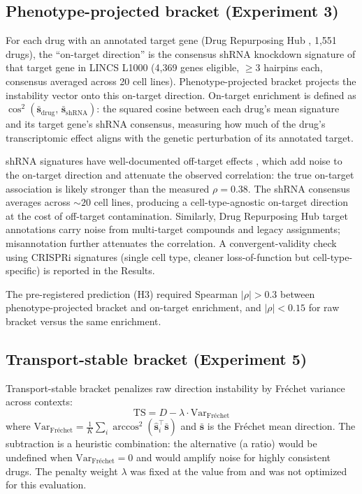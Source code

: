 \documentclass[11pt]{article}
\begin{document}
\subsection{Phenotype-projected bracket (Experiment 3)}

For each drug with an annotated target gene (Drug Repurposing Hub
\citep{corsello2017drug}, 1{,}551 drugs), the ``on-target direction'' is the consensus shRNA
knockdown signature of that target gene in LINCS L1000 (4{,}369 genes
eligible, $\geq$3 hairpins each, consensus averaged across 20 cell lines).
Phenotype-projected bracket projects the instability vector onto this
on-target direction. On-target enrichment is defined as $\cos^2(\bar{\mathbf{s}}_{\text{drug}},\,
\bar{\mathbf{s}}_{\text{shRNA}})$: the squared cosine between each drug's
mean signature and its target gene's shRNA consensus, measuring how much
of the drug's transcriptomic effect aligns with the genetic perturbation of
its annotated target.

shRNA signatures have well-documented off-target effects
\citep{smith2017evaluation}, which add noise to the on-target direction
and attenuate the observed correlation: the true on-target association is
likely stronger than the measured $\rho = 0.38$.
The shRNA consensus averages across ${\sim}20$ cell lines, producing a
cell-type-agnostic on-target direction at the cost of off-target
contamination. Similarly, Drug Repurposing Hub target annotations carry
noise from multi-target compounds and legacy assignments; misannotation
further attenuates the correlation. A convergent-validity
check using CRISPRi signatures (single cell type, cleaner
loss-of-function but cell-type-specific) is reported in the Results.

The pre-registered prediction (H3) required Spearman $|\rho| > 0.3$ between
phenotype-projected bracket and on-target enrichment, and $|\rho| < 0.15$
for raw bracket versus the same enrichment.

\subsection{Transport-stable bracket (Experiment 5)}

Transport-stable bracket penalizes raw direction instability by Fr\'{e}chet
variance across contexts:
\begin{equation}
  \text{TS} = D - \lambda \cdot \text{Var}_{\text{Fr\'echet}}
  \label{eq:ts}
\end{equation}
where $\text{Var}_{\text{Fr\'echet}} = \frac{1}{K}\sum_i
\arccos^2(\hat{\mathbf{s}}_i^\top \bar{\mathbf{s}})$ and
$\bar{\mathbf{s}}$ is the Fr\'echet mean direction. The subtraction is a
heuristic combination: the alternative (a ratio) would be undefined when
$\text{Var}_{\text{Fr\'echet}} = 0$ and would amplify noise for highly
consistent drugs. The penalty weight $\lambda$ was fixed at the value from
\citet{tower2026drug} and was not optimized for this evaluation.
\end{document}
